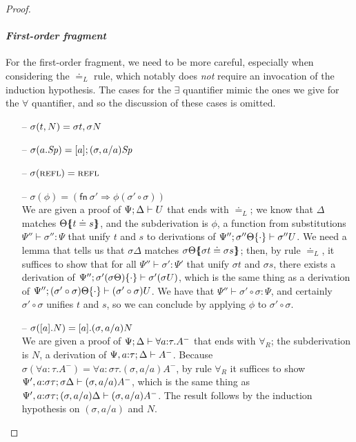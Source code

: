 \begin{proof}
\begin{itemize}
\end{itemize}

\paragraph{\it First-order fragment} For the first-order fragment, we need
to be more careful, especially when considering the 
$\doteq_L$ rule, which notably
does {\it not} require an invocation of the induction hypothesis. The cases
for the $\exists$ quantifier mimic the ones we give for the $\forall$
quantifier, and so the discussion of these cases is omitted.

\begin{itemize}

\item[--]
$\sigma({t},{N}) = {\sigma{t}},{\sigma{N}}$ 

\item[--]
$\sigma({a}.{{\it Sp}}) = [{a}]; {(\sigma, a/a){\it Sp}}$ 

\item[--]
$\sigma(\textsc{refl}) = \textsc{refl}$

\item[--]
$\sigma(\phi) = \left( \mathsf{fn}~\sigma' \Rightarrow \phi (\sigma'
  \circ \sigma) \right)$ \smallskip\\ We are given a proof of
${\Psi};{\Delta} \vdash {U}$ that ends with ${\doteq}_L$; we know that
$\Delta$ matches ${\Theta}\mbox{$\{\hspace{-4pt}\{$}{t \doteq s}\mbox{$\}\hspace{-4pt}\}$}$, and the
subderivation is $\phi$, a function from substitutions 
$\Psi'' \vdash \sigma'' : \Psi$ that unify $t$ and $s$ to derivations
of ${\Psi''};{{\sigma''\Theta}\{{\cdot}\}} \vdash {\sigma''{U}}$. We need a lemma
that tells us that $\sigma\Delta$ matches 
${\sigma\Theta}\mbox{$\{\hspace{-4pt}\{$}{\sigma t \doteq \sigma s}\mbox{$\}\hspace{-4pt}\}$}$; then, by rule
${\doteq}_L$, it suffices to show that for all 
$\Psi'' \vdash \sigma' : \Psi'$ that unify $\sigma t$ and $\sigma s$, 
there exists a derivation of 
${\Psi''};{{\sigma'(\sigma \Theta)}\{{\cdot}\}} \vdash {\sigma'(\sigma U)}$,
which is the same thing as a derivation of 
${\Psi''};{{(\sigma' \circ \sigma) \Theta}\{{\cdot}\}} \vdash {(\sigma' \circ \sigma) U}$. We have that 
$\Psi'' \vdash \sigma' \circ \sigma : \Psi$, and certainly 
$\sigma' \circ \sigma$ unifies $t$ and $s$, so we can conclude by
applying $\phi$ to $\sigma' \circ \sigma$.\smallskip

\item[--]
$\sigma([{a}].{N}) = [{a}].{(\sigma, a/a)N}$ \smallskip\\ We are
given a proof of ${\Psi};{\Delta} \vdash {\forall a{:}\tau.A^-}$ 
that ends with $\forall_R$; the subderivation
is $N$, a derivation of ${\Psi,a{:}\tau};{\Delta} \vdash {A^-}$. Because
$\sigma(\forall{a}{:}{\tau}.A^-) 
 = \forall{a}{:}{\sigma\tau}.(\sigma, a/a){A^-}$,
by rule $\forall_R$ it suffices to show 
${\Psi', a{:}\sigma\tau};{\sigma\Delta} \vdash {(\sigma, a/a)A^-}$, 
which is the same thing
as ${\Psi', a{:}\sigma\tau};{(\sigma, a/a)\Delta} \vdash {(\sigma, a/a)A^-}$.
The result
follows by the induction hypothesis on $(\sigma, a/a)$ and $N$. \smallskip


\end{itemize}
\end{proof}
